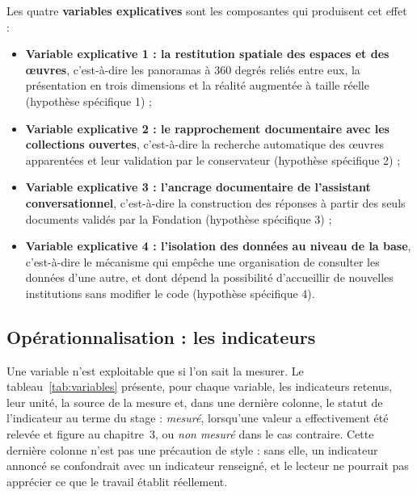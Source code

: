 Les quatre \textbf{variables explicatives} sont les composantes qui produisent
cet effet :

\begin{itemize}
  \item \textbf{Variable explicative 1 : la restitution spatiale des espaces et
        des œuvres}, c'est-à-dire les panoramas à 360 degrés reliés entre eux,
        la présentation en trois dimensions et la réalité augmentée à taille
        réelle (hypothèse spécifique 1) ;
  \item \textbf{Variable explicative 2 : le rapprochement documentaire avec les
        collections ouvertes}, c'est-à-dire la recherche automatique des œuvres
        apparentées et leur validation par le conservateur (hypothèse spécifique
        2) ;
  \item \textbf{Variable explicative 3 : l'ancrage documentaire de l'assistant
        conversationnel}, c'est-à-dire la construction des réponses à partir des
        seuls documents validés par la Fondation (hypothèse spécifique 3) ;
  \item \textbf{Variable explicative 4 : l'isolation des données au niveau de la
        base}, c'est-à-dire le mécanisme qui empêche une organisation de
        consulter les données d'une autre, et dont dépend la possibilité
        d'accueillir de nouvelles institutions sans modifier le code (hypothèse
        spécifique 4).
\end{itemize}

\subsection{Opérationnalisation : les indicateurs}

Une variable n'est exploitable que si l'on sait la mesurer. Le
tableau~\ref{tab:variables} présente, pour chaque variable, les indicateurs
retenus, leur unité, la source de la mesure et, dans une dernière colonne, le
statut de l'indicateur au terme du stage : \emph{mesuré}, lorsqu'une valeur a
effectivement été relevée et figure au chapitre~3, ou \emph{non mesuré} dans le
cas contraire. Cette dernière colonne n'est pas une précaution de style : sans
elle, un indicateur annoncé se confondrait avec un indicateur renseigné, et le
lecteur ne pourrait pas apprécier ce que le travail établit réellement.

